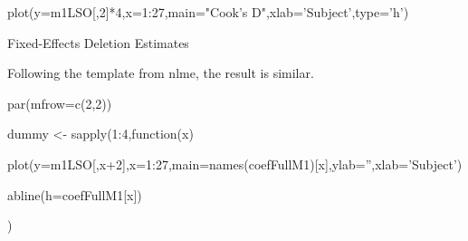 plot(y=m1LSO[,2]*4,x=1:27,main="Cook's D",xlab='Subject',type='h')








Fixed-Effects Deletion Estimates

Following the template from nlme, the result is similar. 


par(mfrow=c(2,2))

dummy <- sapply(1:4,function(x) {

      plot(y=m1LSO[,x+2],x=1:27,main=names(coefFullM1)[x],ylab='',xlab='Subject')

      abline(h=coefFullM1[x])

    })

